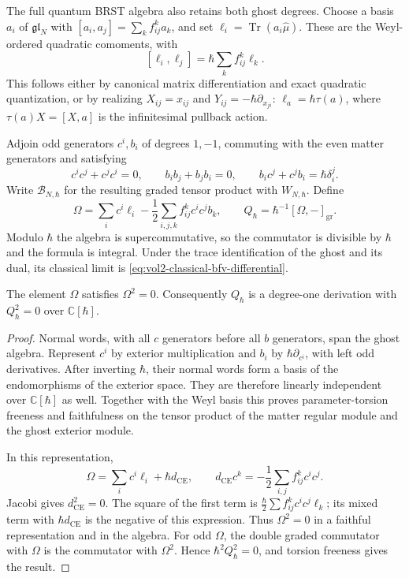 The full quantum BRST algebra also retains both ghost degrees.
Choose a basis $a_i$ of $\mathfrak{gl}_N$ with
$[a_i,a_j]=\sum_k f_{ij}^ka_k$, and set
$\ell_i=\operatorname{Tr}(a_i\widehat\mu)$.
These are the Weyl-ordered quadratic comoments, with
\[
 [\ell_i,\ell_j]=\hbar\sum_k f_{ij}^k\ell_k.
\]
This follows either by canonical matrix differentiation and
exact quadratic quantization, or by realizing
$X_{ij}=x_{ij}$ and $Y_{ij}=-\hbar\partial_{x_{ji}}$:
$\ell_a=\hbar\tau(a)$, where
$\tau(a)X=[X,a]$ is the infinitesimal pullback action.

Adjoin odd generators $c^i,b_i$ of degrees $1,-1$, commuting
with the even matter generators and satisfying
\[
 c^ic^j+c^jc^i=0,\qquad b_ib_j+b_jb_i=0,\qquad
 b_ic^j+c^jb_i=\hbar\delta_i^j.
\]
Write $\mathcal B_{N,\hbar}$ for the resulting graded tensor
product with $W_{N,\hbar}$. Define
\begin{equation}\label{eq:vol2-quantum-bfv-hamiltonian}
 \Omega=\sum_i c^i\ell_i
          -\frac12\sum_{i,j,k}f_{ij}^kc^ic^jb_k,
 \qquad Q_\hbar=\hbar^{-1}[\Omega,-]_{\mathrm{gr}}.
\end{equation}
Modulo $\hbar$ the algebra is supercommutative, so the
commutator is divisible by $\hbar$ and the formula is integral.
Under the trace identification of the ghost and its dual,
its classical limit is
\eqref{eq:vol2-classical-bfv-differential}.

\begin{proposition}\label{prop:vol2-integral-quantum-brst}
The element $\Omega$ satisfies $\Omega^2=0$.
Consequently $Q_\hbar$ is a degree-one derivation with
$Q_\hbar^2=0$ over $\mathbb C[\hbar]$.
\end{proposition}
\begin{proof}
Normal words, with all $c$ generators before all $b$ generators,
span the ghost algebra. Represent $c^i$ by exterior
multiplication and $b_i$ by $\hbar\partial_{c^i}$, with left
odd derivatives. After inverting $\hbar$, their normal words
form a basis of the endomorphisms of the exterior space.
They are therefore linearly independent over
$\mathbb C[\hbar]$ as well. Together with the Weyl basis this
proves parameter-torsion freeness and faithfulness on the
tensor product of the matter regular module and the ghost
exterior module.

In this representation,
\[
 \Omega=\sum_i c^i\ell_i+\hbar d_{\mathrm{CE}},\qquad
 d_{\mathrm{CE}}c^k=-\frac12\sum_{i,j}f_{ij}^kc^ic^j.
\]
Jacobi gives $d_{\mathrm{CE}}^2=0$. The square of the first
term is
$\frac{\hbar}{2}\sum f_{ij}^kc^ic^j\ell_k$; its mixed term
with $\hbar d_{\mathrm{CE}}$ is the negative of this expression.
Thus $\Omega^2=0$ in a faithful representation and in the
algebra. For odd $\Omega$, the double graded commutator with
$\Omega$ is the commutator with $\Omega^2$.
Hence $\hbar^2Q_\hbar^2=0$, and torsion freeness gives the result.
\end{proof}

